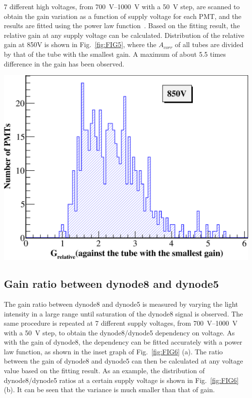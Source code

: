 \documentclass[a4paper,10pt,twoside]{cpc-hepnp}
\begin{document}
\begin{CJK*}{UTF8}{gbsn}
\begin{multicols}{2}
7 different high voltages, from \SIrange{700}{1000}{\volt} with a \SI{50}{\volt} step, are scanned to obtain the gain variation as a function of supply voltage for each PMT, and the results are fitted using the power law function~\citep{hamamatsu}.
Based on the fitting result, the relative gain at any supply voltage can be calculated.
Distribution of the relative gain at 850V is shown in Fig.~\ref{fig:FIG5}, where the $A_{corr}$ of all tubes are divided by that of the tube with the smallest gain. 
A maximum of about 5.5 times difference in the gain has been observed.

\begin{center}
	\includegraphics[width=\linewidth]{FIG5}
\end{center}

\subsection{Gain ratio between dynode8 and dynode5}
\label{sec:psd_dy58}

The gain ratio between dynode8 and dynode5 is measured by varying the light intensity in a large range until saturation of the dynode8 signal is observed.
The same procedure is repeated at 7 different supply voltages, from \SIrange{700}{1000}{\volt} with a \SI{50}{\volt} step, to obtain the dynode8/dynode5 dependency on voltage.
As with the gain of dynode8, the dependency can be fitted accurately with a power law function, as shown in the inset graph of Fig.~\ref{fig:FIG6} (a).
The ratio between the gain of dynode8 and dynode5 can then be calculated at any voltage value based on the fitting result.
As an example, the distribution of dynode8/dynode5 ratios at a certain supply voltage is shown in Fig.~\ref{fig:FIG6} (b).
It can be seen that the variance is much smaller than that of gain.


\end{multicols}
\end{CJK*}
\end{document}
